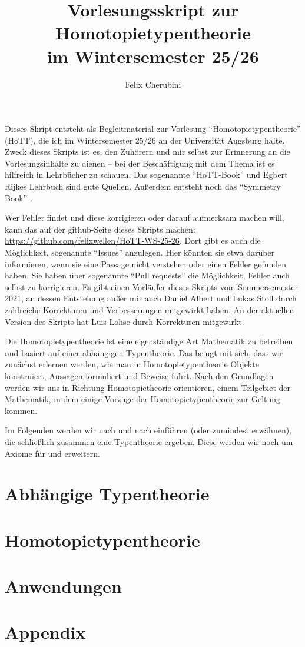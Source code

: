 \documentclass{../util/hott}
\title{Vorlesungsskript zur Homotopietypentheorie \\ im Wintersemester 25/26}
\author{Felix Cherubini}
\begin{document}
\maketitle

\tableofcontents
 \pagebreak
Dieses Skript entsteht als Begleitmaterial zur Vorlesung ``Homotopietypentheorie'' (HoTT), die ich im Wintersemester 25/26 an der Universität Augsburg halte.
Zweck dieses Skripts ist es, den Zuhörern und mir selbst zur Erinnerung an die Vorlesungsinhalte zu dienen --
bei der Beschäftigung mit dem Thema ist es hilfreich in Lehrbücher zu schauen.
Das sogenannte ``HoTT-Book''\cite{hott} und Egbert Rijkes Lehrbuch \cite{rijke} sind gute Quellen.
Außerdem entsteht noch das ``Symmetry Book'' \cite{Sym}.

Wer Fehler findet und diese korrigieren oder darauf aufmerksam machen will, kann das auf der github-Seite dieses Skripts machen:
\href{https://github.com/felixwellen/HoTT-WS-25-26}{https://github.com/felixwellen/HoTT-WS-25-26}.
Dort gibt es auch die Möglichkeit, sogenannte ``Issues'' anzulegen.
Hier könnten sie etwa darüber informieren, wenn sie eine Passage nicht verstehen oder einen Fehler gefunden haben.
Sie haben über sogenannte ``Pull requests'' die Möglichkeit, Fehler auch selbst zu korrigieren.
Es gibt einen Vorläufer dieses Skripts vom Sommersemester 2021, an dessen Entstehung außer mir auch Daniel Albert und Lukas Stoll durch zahlreiche Korrekturen und Verbesserungen mitgewirkt haben.
An der aktuellen Version des Skripts hat Luis Lohse durch Korrekturen mitgewirkt.

Die Homotopietypentheorie ist eine eigenständige Art Mathematik zu betreiben und basiert auf einer abhängigen Typentheorie.
Das bringt mit sich, dass wir zunächst erlernen werden, wie man in Homotopietypentheorie Objekte konstruiert, Aussagen formuliert und Beweise führt.
Nach den Grundlagen werden wir uns in Richtung Homotopietheorie orientieren, einem Teilgebiet der Mathematik, in dem einige Vorzüge der Ho\-mo\-to\-pie\-ty\-pen\-theo\-rie zur Geltung kommen.

Im Folgenden werden wir nach und nach  einführen (oder zumindest erwähnen), die schließlich zusammen eine Typentheorie ergeben.
Diese werden wir noch um Axiome für  und  erweitern.

\section{Abhängige Typentheorie}


\pagebreak
\section{Homotopietypentheorie}


\pagebreak
\section{Anwendungen}

\pagebreak
\appendix
\section{Appendix}


\printindex

\printbibliography
\end{document}
